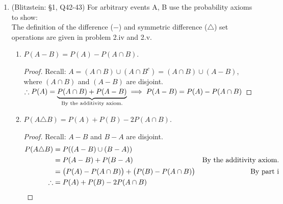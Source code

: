 \documentclass[11pt]{article}
\begin{document}
\begin{enumerate}
		\newpage
		\item (Blitzstein: \S 1, Q42-43) For arbitrary events A, B use the probability axioms to show:\\
			{\footnotesize The definition of the difference ($ - $) and symmetric difference ($ \triangle $) set operations are given in problem 2.iv and 2.v.}
			\begin{enumerate}
				\item $ P(A - B)=P(A) - P(A \cap B) $.
					\begin{mdframed}
						\begin{proof}
							Recall: $ A = (A \cap B) \cup (A \cap B^c) = (A \cap B) \cup (A - B)$, where $ (A \cap B) $ and $ (A - B) $ are disjoint.\\
							$ \therefore P(A) = \underbrace{P(A \cap B) + P(A - B)}_{\text{By the additivity axiom.}} \implies  P(A - B)=P(A) - P(A \cap B ) \qedhere$
						\end{proof}
					\end{mdframed}
				\item $P(A \triangle B)=P(A)+P(B) - 2P(A \cap B) $.
					\begin{mdframed}
						\begin{proof}
							Recall: $ A - B $ and $ B - A $ are disjoint.
							\begin{align*}
								P(A \triangle B) &= P((A - B) \cup (B - A))\\
								&= P(A-B) + P(B-A) &\text{By the additivity axiom.}\\
								&= \left( P(A) - P(A \cap B) \right) + \left( P(B) - P(A \cap B) \right) &\text{By part i}\\
								\therefore &=P(A)+P(B) - 2P(A \cap B) &\qedhere
							\end{align*}
						\end{proof}
					\end{mdframed}
			\end{enumerate}


\end{enumerate}
\end{document}
